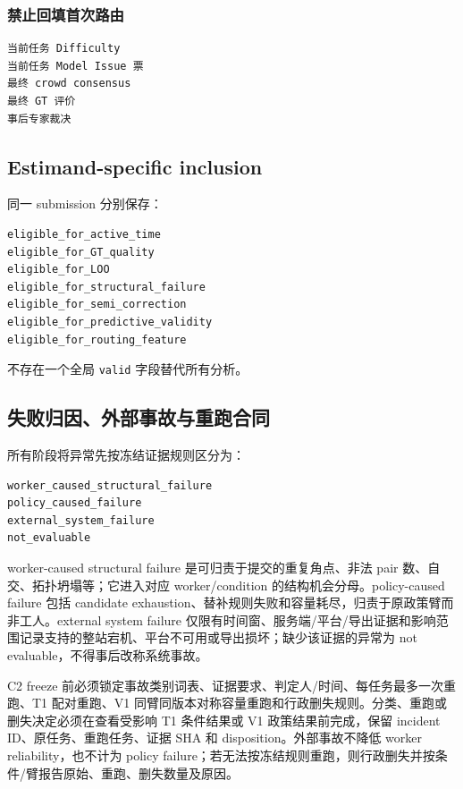 \subsubsection{禁止回填首次路由}

\begin{verbatim}
当前任务 Difficulty
当前任务 Model Issue 票
最终 crowd consensus
最终 GT 评价
事后专家裁决
\end{verbatim}

\subsection{Estimand-specific inclusion}

同一 submission 分别保存：

\begin{verbatim}
eligible_for_active_time
eligible_for_GT_quality
eligible_for_LOO
eligible_for_structural_failure
eligible_for_semi_correction
eligible_for_predictive_validity
eligible_for_routing_feature
\end{verbatim}

不存在一个全局 \texttt{valid} 字段替代所有分析。

\subsection{失败归因、外部事故与重跑合同}

所有阶段将异常先按冻结证据规则区分为：

\begin{verbatim}
worker_caused_structural_failure
policy_caused_failure
external_system_failure
not_evaluable
\end{verbatim}

worker-caused structural failure 是可归责于提交的重复角点、非法 pair 数、自交、拓扑坍塌等；它进入对应 worker/condition 的结构机会分母。policy-caused failure 包括 candidate exhaustion、替补规则失败和容量耗尽，归责于原政策臂而非工人。external system failure 仅限有时间窗、服务端/平台/导出证据和影响范围记录支持的整站宕机、平台不可用或导出损坏；缺少该证据的异常为 not evaluable，不得事后改称系统事故。

C2 freeze 前必须锁定事故类别词表、证据要求、判定人/时间、每任务最多一次重跑、T1 配对重跑、V1 同臂同版本对称容量重跑和行政删失规则。分类、重跑或删失决定必须在查看受影响 T1 条件结果或 V1 政策结果前完成，保留 incident ID、原任务、重跑任务、证据 SHA 和 disposition。外部事故不降低 worker reliability，也不计为 policy failure；若无法按冻结规则重跑，则行政删失并按条件/臂报告原始、重跑、删失数量及原因。

